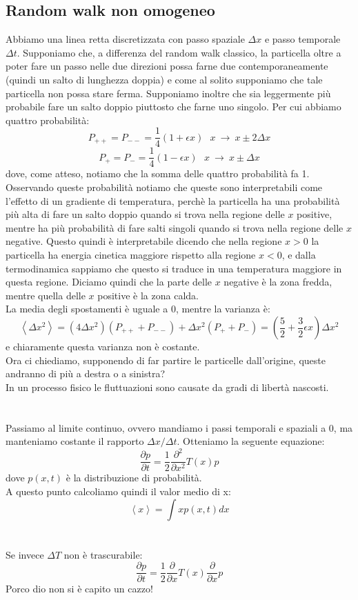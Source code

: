 \documentclass[12pt]{article}
\newcommand{\lang}{\left\langle}
\newcommand{\rang}{\right\rangle}
\begin{document}
\subsection{Random walk non omogeneo}
Abbiamo una linea retta discretizzata con passo spaziale $\Delta x$ e passo temporale $\Delta t$. Supponiamo che, a differenza del random walk classico, la particella oltre a poter fare un passo nelle due direzioni possa farne due contemporaneamente (quindi un salto di lunghezza doppia) e come al solito supponiamo che tale particella non possa stare ferma. Supponiamo inoltre che sia leggermente più probabile fare un salto doppio piuttosto che farne uno singolo. Per cui abbiamo quattro probabilità:
$$
	P_{++} = P_{--} = \frac{1}{4}(1+\epsilon x) \ \ \ x \ \longrightarrow \ x \pm 2\Delta x
$$
$$
	P_+ = P_- = \frac{1}{4}(1-\epsilon x) \ \ \ x \ \longrightarrow \ x \pm \Delta x
$$
dove, come atteso, notiamo che la somma delle quattro probabilità fa 1.\\
Osservando queste probabilità notiamo che queste sono interpretabili come l'effetto di un gradiente di temperatura, perchè la particella ha una probabilità più alta di fare un salto doppio quando si trova nella regione delle $x$ positive, mentre ha più probabilità di fare salti singoli quando si trova nella regione delle $x$ negative. Questo quindi è interpretabile dicendo che nella regione $x>0$ la particella ha energia cinetica maggiore rispetto alla regione $x<0$, e dalla termodinamica sappiamo che questo si traduce in una temperatura maggiore in questa regione. 
Diciamo quindi che la parte delle $x$ negative è la zona fredda, mentre quella delle $x$ positive è la zona calda. \\
La media degli spostamenti è uguale a 0, mentre la varianza è:
$$
	\lang \Delta x^2 \rang = (4\Delta x^2)(P_{++} + P_{--}) + \Delta x^2(P_+ + P_-) = \left(\frac{5}{2} + \frac{3}{2}\epsilon x\right)\Delta x^2
$$
e chiaramente questa varianza non è costante. \\
Ora ci chiediamo, supponendo di far partire le particelle dall'origine, queste andranno di più a destra o a sinistra? \\
In un processo fisico le fluttuazioni sono causate da gradi di libertà nascosti. \\ \\ \\
Passiamo al limite continuo, ovvero mandiamo i passi temporali e spaziali a 0, ma manteniamo costante il rapporto $\Delta x/\Delta t$. Otteniamo la seguente equazione:
$$
	\frac{\partial p}{\partial t} = \frac{1}{2}\frac{\partial^2}{\partial x^2}T(x)p
$$
dove $p(x,t)$ è la distribuzione di probabilità. \\
A questo punto calcoliamo quindi il valor medio di x:
$$
	\lang x \rang = \int xp(x,t)dx
$$ \\ \\
Se invece $\Delta T$ non è trascurabile:
$$
	\frac{\partial p}{\partial t} = \frac{1}{2}\frac{\partial}{\partial x}T(x)\frac{\partial}{\partial x}p
$$
Porco dio non si è capito un cazzo!
\end{document}
